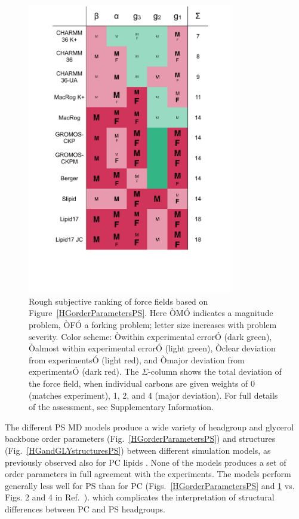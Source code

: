 \documentclass[aps,prl,superscriptaddress,twocolumn]{revtex4}
\begin{document}
\begin{figure}[]
  \centering
  \includegraphics[width=9.0cm]{../Figs/comparisonTablePS.pdf}
  \caption{\label{comparisonTablePS}
    Rough subjective ranking of force fields based on Figure~\ref{HGorderParametersPS}.
    Here ÒMÓ indicates a magnitude problem, ÒFÓ a forking problem; letter size increases with problem severity. Color scheme: Òwithin experimental errorÓ (dark green), Òalmost within experimental errorÓ (light green), Òclear deviation from experimentsÓ (light red), and Òmajor deviation from experimentsÓ (dark red). The $\Sigma$-column shows the total deviation of the force field, when individual carbons are given weights of 0 (matches experiment), 1, 2, and 4 (major deviation). For full details of the assessment, see Supplementary Information.
  }
\end{figure}

The different PS MD models produce a wide variety of headgroup and glycerol backbone order parameters (Fig.~\ref{HGorderParametersPS})
and structures (Fig.~\ref{HGandGLYstructuresPS}) between different simulation models,
as previously observed also for PC lipids \cite{botan15}. None of the models produces a set of order parameters in full agreement with the experiments. The models perform generally less well for PS than for PC
(Figs.~\ref{HGorderParametersPS} and \ref{comparisonTablePS} vs. Figs. 2 and 4 in Ref.~\cite{botan15}).
which complicates the interpretation of structural differences between PC and PS headgroups.
\end{document}

